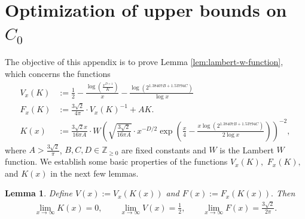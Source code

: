 \documentclass[11pt,letterpaper,reqno]{amsart}
\newtheorem{lemma}[theorem]{Lemma}
\theoremstyle{definition}
\numberwithin{equation}{section}
\numberwithin{figure}{section}
\numberwithin{table}{section}
\begin{document}
\appendix

\section{Optimization of upper bounds on \texorpdfstring{$C_0$}{C0}}\label{section:lambert-lemmata}

The objective of this appendix is to prove Lemma \ref{lem:lambert-w-function}, which concerns the functions
\begin{align}
    \label{eqn:temp-def-V_x(K)}
        V_x(K) &:= \frac{1}{2} - \frac{\log\left( \frac{x^{D + 1}}{K}  \right)}{x} - \frac{\log \left( 2^{1.38407B +  1.53794C}  \right)}{\log x}\\
        F_x(K) &:= \frac{3\sqrt{2}}{4\pi} \cdot V_x(K)^{-1} + AK.\\
            K(x) &:= \frac{3\sqrt{2} x}{16 \pi A} \cdot W\! \left( \sqrt{\frac{3\sqrt{2}}{16 \pi A}} \cdot x^{-D/2} \exp\left( \frac{x}{4} - \frac{x \log\left( 2^{1.38407B +  1.53794C}  \right)}{2\log x}  \right)  \right)^{-2}, \label{eqn:temp-def-K(x)}
\end{align}
where $A > \frac{3\sqrt{2}}{\pi}$, $B, C, D \in \mathbb{Z}_{\geq 0}$ are fixed constants and $W$ is the Lambert $W$ function. We establish some basic properties of the functions $V_x(K),$ $F_x(K),$ and $K(x)$ in the next few lemmas.

\begin{lemma}\label{lem:limits-of-lambert-functions}
    Define $V(x) := V_x(K(x))$ and $F(x) := F_x(K(x)).$ Then
    \begin{align}
        \lim_{x \rightarrow \infty} K(x) = 0,\qquad \lim_{x \rightarrow \infty} V(x) = \frac{1}{2}, \qquad \lim_{x \rightarrow \infty} F(x) = \frac{3\sqrt{2}}{2\pi}.
    \end{align}
\end{lemma}
\end{document}
